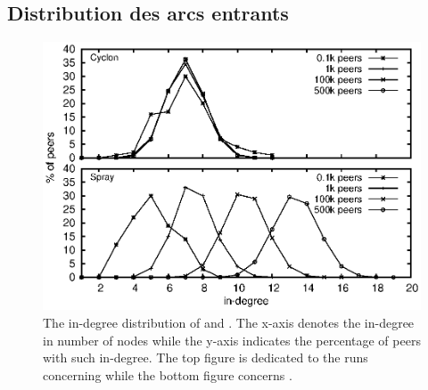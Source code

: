 \subsection{Distribution des arcs entrants}

\begin{figure}
  \centering
  \includegraphics[width=.8\textwidth]{img/spray/histo.eps}
  \caption{\label{fig:spray:histo}The in-degree distribution of \CYCLON and
    \SPRAY. The x-axis denotes the in-degree in number of nodes while the
    y-axis indicates the percentage of peers with such in-degree. The top
    figure is dedicated to the runs concerning \CYCLON while the bottom figure
    concerns \SPRAY.}
\end{figure}

